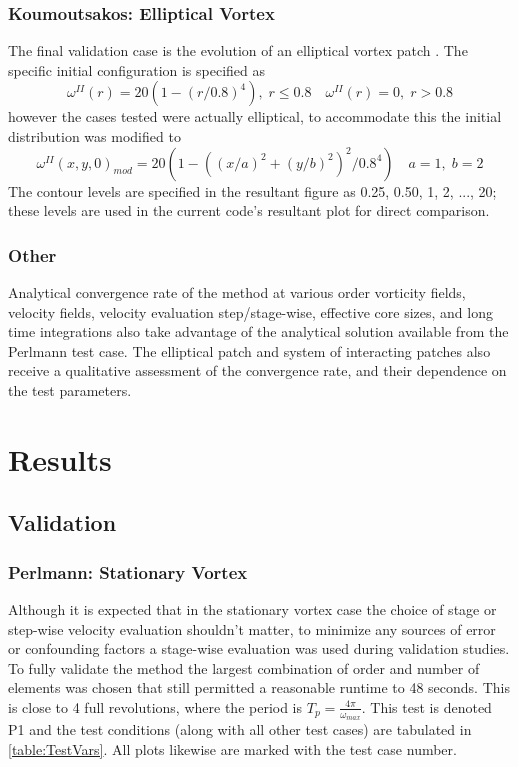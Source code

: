 \documentclass[letterpaper,12pt]{report}
\newcommand{\be}{\begin{equation}}
\newcommand{\ee}{\end{equation}}
\begin{document}
\subsection{Koumoutsakos: Elliptical Vortex}
The final validation case is the evolution of an elliptical vortex patch \cite{Koum1997}. The specific initial configuration is specified as
\be \omega^{II}(r) = 20(1-(r/0.8)^4), \; r\leq 0.8 \quad \omega^{II}(r)=0, \; r>0.8 \ee
however the cases tested were actually elliptical, to accommodate this the initial distribution was modified to
\be \omega^{II}(x,y,0)_{mod} = 20(1-((x/a)^2+(y/b)^2)^2/0.8^4 ) \quad a=1, \; b=2 \ee
The contour levels are specified in the resultant figure as 0.25, 0.50, 1, 2, ..., 20; these levels are used in the current code's resultant plot for direct comparison.

\subsection{Other}
Analytical convergence rate of the method at various order vorticity fields, velocity fields, velocity evaluation step/stage-wise, effective core sizes, and long time integrations also take advantage of the analytical solution available from the Perlmann test case. The elliptical patch and system of interacting  patches also receive a qualitative assessment of the convergence rate, and their dependence on the test parameters.

\chapter{Results}
\section{Validation}
\subsection{Perlmann: Stationary Vortex}
Although it is expected that in the stationary vortex case the choice of stage or step-wise velocity evaluation shouldn't matter, to minimize any sources of error or confounding factors a stage-wise evaluation was used during validation studies. To fully validate the method the largest combination of order and number of elements was chosen that still permitted a reasonable runtime to 48 seconds. This is close to 4 full revolutions, where the period is $T_p = \frac{4 \pi}{\omega_{max}}$. This test is denoted P1 and the test conditions (along with all other test cases) are tabulated in \ref{table:TestVars}. All plots likewise are marked with the test case number.
\end{document}
